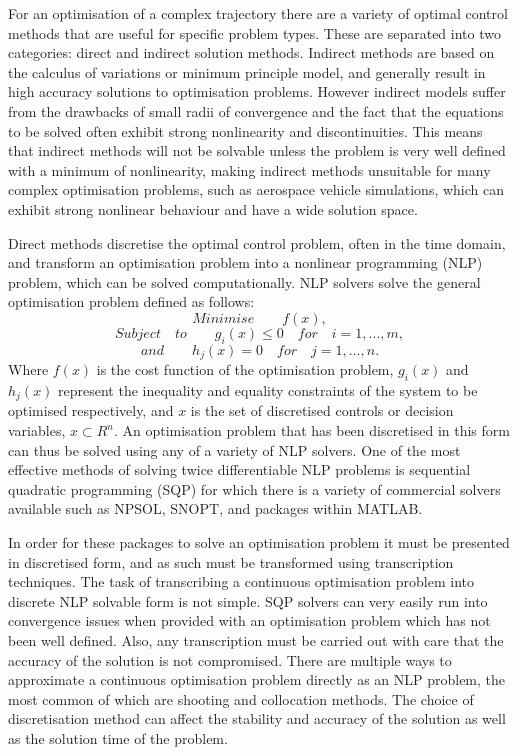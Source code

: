 For an optimisation of a complex trajectory there are a variety of optimal control methods that are useful for specific problem types. These are separated into two categories: direct and indirect solution methods\cite{Betts1998}. Indirect methods are based on the calculus of variations or minimum principle model, and generally result in high accuracy solutions to optimisation problems\cite{Bulirsch1993}. However indirect models suffer from the drawbacks of small radii of convergence and the fact that the equations to be solved often exhibit strong nonlinearity and discontinuities. This means that indirect methods will not be solvable unless the problem is very well defined with a minimum of nonlinearity, making indirect methods unsuitable for many complex optimisation problems, such as aerospace vehicle simulations, which can exhibit strong nonlinear behaviour and have a wide solution space. 

Direct methods discretise the optimal control problem, often in the time domain, and transform an optimisation problem into a nonlinear programming (NLP) problem, which can be solved computationally\cite{Stryk1992}. NLP solvers solve the general optimisation problem defined as follows\cite{Bazaraa2013}:
\begin{equation}
Minimise \qquad f(x),
\end{equation}
\begin{equation}
Subject \quad to \qquad g_i(x)\leq0 \quad for \quad i=1,...,m,
\end{equation}
\begin{equation}
and \qquad h_j(x) = 0 \quad for \quad j=1,...,n.
\end{equation}
Where $f(x)$ is the cost function of the optimisation problem, $g_i(x)$ and $h_j(x)$ represent the inequality and equality constraints of the system to be optimised respectively, and $x$ is the set of discretised controls or decision variables, $x \subset R^n$. 
An optimisation problem that has been discretised in this form can thus be solved using any of a variety of NLP solvers. One of the most effective methods of solving twice differentiable NLP problems is sequential quadratic programming (SQP)\cite{Boggs2000} for which there is a variety of commercial solvers available such as NPSOL, SNOPT, and packages within MATLAB. 

In order for these packages to solve an optimisation problem it must be presented in discretised form, and as such must be transformed using transcription techniques\cite{Kelly2015}. The task of transcribing a continuous optimisation problem into discrete NLP solvable form is not simple. SQP solvers can very easily run into convergence issues when provided with an optimisation problem which has not been well defined. Also, any transcription must be carried out with care that the accuracy of the solution is not compromised. 
There are multiple ways to approximate a continuous optimisation problem directly as an NLP problem, the most common of which are shooting and collocation methods. The choice of discretisation method can affect the stability and accuracy of the solution as well as the solution time of the problem. 


